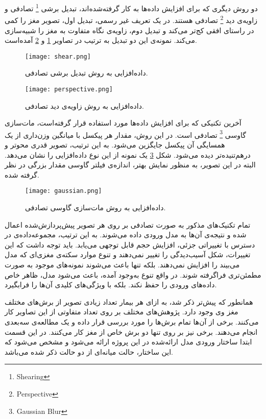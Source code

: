 دو روش دیگری که برای افزایش داده‌ها به کار گرفته‌شده‌اند، تبدیل برشی
\footnote{Shearing}
تصادفی و زاویه‌ی دید
\footnote{Perspective}
تصادفی هستند.
در یک تعریف غیر رسمی، تبدیل اول، تصویر مغز را کمی در راستای افقی کج‌تر می‌کند و تبدیل دوم، زاویه‌ی نگاه متفاوت به مغز را شبیه‌سازی می‌کند.
نمونه‌ی این دو تبدیل به ترتیب در تصاویر \ref{fig:shear} و \ref{fig:perspective} آمده‌است.

\begin{figure}[ht]
\centering
\texttt{[image: shear.png]}
\caption[]{داده‌افزایی به روش تبدیل برشی تصادفی.}
\label{fig:shear}
\end{figure}

\begin{figure}[ht]
\centering
\texttt{[image: perspective.png]}
\caption[]{داده‌افزایی به روش زاویه‌ی دید تصادفی.}
\label{fig:perspective}
\end{figure}

آخرین تکنیکی که برای افزایش داده‌ها مورد استفاده قرار گرفته‌است، 
مات‌سازی گاوسی
\footnote{Gaussian Blur}
تصادفی است.
در این روش، مقدار هر پیکسل با میانگین وزن‌داری از یک همسایگی آن پیکسل جایگزین می‌شود.
به این ترتیب، تصویر قدری محو‌تر و درهم‌تنیده‌تر دیده می‌شود.
شکل \ref{fig:gaussian} یک نمونه از این نوع داده‌افزایی را نشان می‌دهد.
البته در این تصویر، به منظور نمایش بهتر، اندازه‌ی فیلتر گاوسی مقدار بزرگی در نظر گرفته شده.

\begin{figure}[ht]
\centering
\texttt{[image: gaussian.png]}
\caption[]{داده‌افزایی به روش مات‌سازی گاوسی تصادفی.}
\label{fig:gaussian}
\end{figure}

تمام تکنیک‌های مذکور به صورت تصادفی بر روی هر تصویر پیش‌پردازش‌شده اعمال شده و نتیجه‌ی آن‌ها
به مدل ورودی داده می‌شوند.
به این ترتیب، مجموعه‌داده‌ی در دسترس با تغییراتی جزئی، افزایش حجم قابل توجهی می‌یابد.
باید توجه داشت که این تغییرات، شکل آسیب‌دیدگی را تغییر نمی‌دهند و تنوع موارد سکته‌ی مغزی‌ای که مدل می‌بیند را 
افزایش نمی‌دهند.
بلکه تنها باعث می‌شوند نمونه‌های موجود به صورت مطمئن‌تری فراگرفته شوند.
در واقع تنوع به‌وجود آمده، باعث می‌شود مدل، ظاهر خاص داده‌های ورودی را حفظ نکند. بلکه با ویژگی‌های کلیدی آن‌ها را فرابگیرد.


همانطور که پیش‌تر ذکر شد، به ازای هر بیمار تعداد زیادی تصویر از برش‌های مختلف مغز وی وجود دارد.
پژوهش‌ها‌ی مختلف بر روی تعداد متفاوتی از این تصاویر کار می‌کنند.
برخی از آن‌ها تمام برش‌ها را مورد بررسی قرار داده و یک مطالعه‌ی سه‌بعدی انجام می‌دهند.
برخی نیز بر روی تنها دو برش خاص از مغز کار می‌کنند.
در این قسمت ابتدا ساختار ورودی مدل ارائه‌شده در این پروژه ارائه می‌شود
و مشخص می‌شود که
این ساختار، حالت میانه‌ای از دو حالت ذکر شده می‌باشد.

